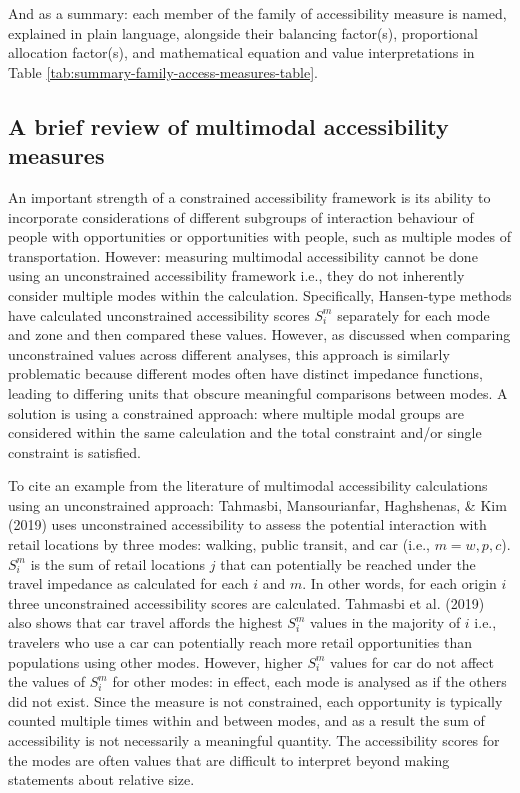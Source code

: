 \documentclass[
11pt, %
oneside, %
english, %
singlespacing, %
]{macthesis} %
\begin{document}
And as a summary: each member of the family of accessibility measure is named, explained in plain language, alongside their balancing factor(s), proportional allocation factor(s), and mathematical equation and value interpretations in Table \ref{tab:summary-family-access-measures-table}.



\subsection{A brief review of multimodal accessibility measures}\label{a-brief-review-of-multimodal-accessibility-measures}

An important strength of a constrained accessibility framework is its ability to incorporate considerations of different subgroups of interaction behaviour of people with opportunities or opportunities with people, such as multiple modes of transportation. However: measuring multimodal accessibility cannot be done using an unconstrained accessibility framework i.e., they do not inherently consider multiple modes within the calculation. Specifically, Hansen-type methods have calculated unconstrained accessibility scores \(S_i^m\) separately for each mode and zone and then compared these values. However, as discussed when comparing unconstrained values across different analyses, this approach is similarly problematic because different modes often have distinct impedance functions, leading to differing units that obscure meaningful comparisons between modes. A solution is using a constrained approach: where multiple modal groups are considered within the same calculation and the total constraint and/or single constraint is satisfied.

To cite an example from the literature of multimodal accessibility calculations using an unconstrained approach: Tahmasbi, Mansourianfar, Haghshenas, \& Kim (2019) uses unconstrained accessibility to assess the potential interaction with retail locations by three modes: walking, public transit, and car (i.e., \(m = w, p, c\)). \(S_i^m\) is the sum of retail locations \(j\) that can potentially be reached under the travel impedance as calculated for each \(i\) and \(m\). In other words, for each origin \(i\) three unconstrained accessibility scores are calculated. Tahmasbi et al. (2019) also shows that car travel affords the highest \(S_i^{m}\) values in the majority of \(i\) i.e., travelers who use a car can potentially reach more retail opportunities than populations using other modes. However, higher \(S_i^{m}\) values for car do not affect the values of \(S_i^{m}\) for other modes: in effect, each mode is analysed as if the others did not exist. Since the measure is not constrained, each opportunity is typically counted multiple times within and between modes, and as a result the sum of accessibility is not necessarily a meaningful quantity. The accessibility scores for the modes are often values that are difficult to interpret beyond making statements about relative size.
\end{document}

